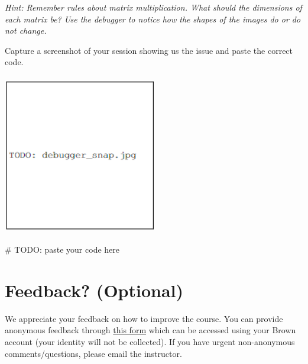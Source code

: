 \documentclass{csci1430}
\begin{document}
\emph{Hint: Remember rules about matrix multiplication. What should the dimensions of each matrix be? Use the debugger to notice how the shapes of the images do or do not change.}

Capture a screenshot of your session showing us the issue and paste the correct code.

\begin{answer}[height=20]
    \includegraphics[width=0.5\textwidth,height=7cm,keepaspectratio]{images/TODO_debugger_snap.jpg}
    
\end{answer}

\pagebreak

\begin{answer}[height=30]
\begin{python}
# TODO: paste your code here
\end{python}
\end{answer}


\pagebreak

\section*{Feedback? (Optional)}
We appreciate your feedback on how to improve the course. You can provide anonymous feedback through \href{https://forms.gle/Eu5jJbDUmLknAyJV9}{this form} which can be accessed using your Brown account (your identity will not be collected). If you have urgent non-anonymous comments/questions, please email the instructor. 
\end{document}
